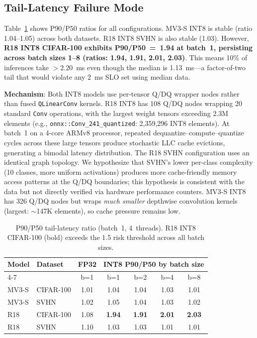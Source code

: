 \documentclass[journal]{IEEEtran}
\begin{document}
\subsection{Tail-Latency Failure Mode}

Table~\ref{tab:tail} shows P90/P50 ratios for all configurations. MV3-S INT8 is stable (ratio 1.04--1.05) across both datasets. R18 INT8 SVHN is also stable (1.03). However, \textbf{R18 INT8 CIFAR-100 exhibits P90/P50~=~1.94 at batch~1, persisting across batch sizes 1--8 (ratios: 1.94, 1.91, 2.01, 2.03)}. This means 10\% of inferences take $>$2.20~ms even though the median is 1.13~ms—a factor-of-two tail that would violate any 2~ms SLO set using median data.

\textbf{Mechanism}: Both INT8 models use per-tensor Q/DQ wrapper nodes rather than fused \texttt{QLinearConv} kernels. R18 INT8 has 108 Q/DQ nodes wrapping 20 standard \texttt{Conv} operations, with the largest weight tensors exceeding 2.3M elements (e.g., \texttt{onnx::Conv\_241\_quantized}: 2,359,296 INT8 elements). At batch~1 on a 4-core ARMv8 processor, repeated dequantize--compute--quantize cycles across these large tensors produce stochastic LLC cache evictions, generating a bimodal latency distribution. The R18 SVHN configuration uses an identical graph topology. We hypothesize that SVHN's lower per-class complexity (10 classes, more uniform activations) produces more cache-friendly memory access patterns at the Q/DQ boundaries; this hypothesis is consistent with the data but not directly verified via hardware performance counters. MV3-S INT8 has 326 Q/DQ nodes but wraps \emph{much smaller} depthwise convolution kernels (largest: $\sim$147K elements), so cache pressure remains low.

\begin{table}[t]
\centering
\caption{P90/P50 tail-latency ratio (batch~1, 4~threads). R18 INT8 CIFAR-100 (bold) exceeds the 1.5 risk threshold across all batch sizes.}
\label{tab:tail}
\small
\setlength{\tabcolsep}{5pt}
\begin{tabular}{@{}llccccc@{}}
\toprule
\textbf{Model} & \textbf{Dataset} & \textbf{FP32} & \multicolumn{4}{c}{\textbf{INT8 P90/P50 by batch size}} \\
\cmidrule(l){4-7}
 & & b=1 & b=1 & b=2 & b=4 & b=8 \\
\midrule
MV3-S & CIFAR-100 & 1.01 & 1.04 & 1.04 & 1.03 & 1.01 \\
MV3-S & SVHN      & 1.02 & 1.05 & 1.04 & 1.03 & 1.02 \\
R18   & CIFAR-100 & 1.08 & \textbf{1.94} & \textbf{1.91} & \textbf{2.01} & \textbf{2.03} \\
R18   & SVHN      & 1.10 & 1.03 & 1.03 & 1.01 & 1.01 \\
\bottomrule
\end{tabular}
\end{table}
\end{document}
